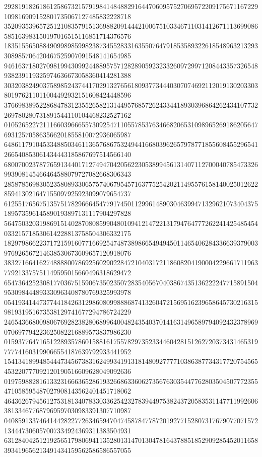 \begin{DoxyCode}
      292819182618612586732157919841484882916447060957527069572209175671167229109816909152801735067127485832228718
      352093539657251210835791513698820914442100675103346711031412671113699086585163983150197016515116851714376576
      183515565088490998985998238734552833163550764791853589322618548963213293308985706420467525907091548141654985
      946163718027098199430992448895757128289059232332609729971208443357326548938239119325974636673058360414281388
      303203824903758985243744170291327656180937734440307074692112019130203303801976211011004492932151608424448596
      376698389522868478312355265821314495768572624334418930396864262434107732269780280731891544110104468232527162
      010526522721116603966655730925471105578537634668206531098965269186205647693125705863566201855810072936065987
      648611791045334885034611365768675324944166803962657978771855608455296541266540853061434443185867697514566140
      680070023787765913440171274947042056223053899456131407112700040785473326993908145466464588079727082668306343
      285878569830523580893306575740679545716377525420211495576158140025012622859413021647155097925923099079654737
      612551765675135751782966645477917450112996148903046399471329621073404375189573596145890193897131117904297828
      564750320319869151402870808599048010941214722131794764777262241425485454033215718530614228813758504306332175
      182979866223717215916077166925474873898665494945011465406284336639379003976926567214638530673609657120918076
      383271664162748888007869256029022847210403172118608204190004229661711963779213375751149595015660496318629472
      654736425230817703675159067350235072835405670403867435136222247715891504953098444893330963408780769325993978
      054193414473774418426312986080998886874132604721569516239658645730216315981931951673538129741677294786724229
      246543668009806769282382806899640048243540370141631496589794092432378969070697794223625082216889573837986230
      015937764716512289357860158816175578297352334460428151262720373431465319777741603199066554187639792933441952
      154134189948544473456738316249934191318148092777710386387734317720754565453220777092120190516609628049092636
      019759882816133231666365286193266863360627356763035447762803504507772355471058595487027908143562401451718062
      464362679456127531813407833033625423278394497538243720583531147711992606381334677687969597030983391307710987
      040859133746414428227726346594704745878477872019277152807317679077071572134447306057007334924369311383504931
      631284042512192565179806941135280131470130478164378851852909285452011658393419656213491434159562586586557055

\end{DoxyCode}
